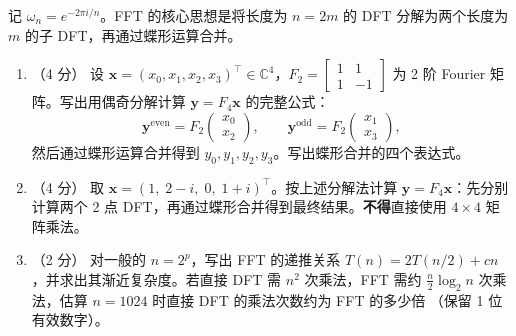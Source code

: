 \documentclass[10pt,a4paper]{exam-zh}
\newcommand{\bvec}[1]{\boldsymbol{#1}}
\newcommand{\C}{\mathbb{C}}
\begin{document}
\begin{problem}[points = 10]

记 $\omega_n = e^{-2\pi i/n}$。FFT 的核心思想是将长度为 $n=2m$ 的 DFT 分解为两个长度为 $m$ 的子 DFT，再通过蝶形运算合并。

\begin{enumerate}
    \item （4 分） 设 $\bvec{x} = (x_0, x_1, x_2, x_3)^\top \in \C^4$，$F_2 = \begin{bmatrix} 1 & 1 \\ 1 & -1 \end{bmatrix}$ 为 2 阶 Fourier 矩阵。写出用偶奇分解计算 $\bvec{y} = F_4 \bvec{x}$ 的完整公式：
    \[
    \bvec{y}^{\text{even}} = F_2\begin{pmatrix} x_0 \\ x_2 \end{pmatrix}, \qquad
    \bvec{y}^{\text{odd}} = F_2\begin{pmatrix} x_1 \\ x_3 \end{pmatrix},
    \]
    然后通过蝶形运算合并得到 $y_0, y_1, y_2, y_3$。写出蝶形合并的四个表达式。

    \item （4 分） 取 $\bvec{x} = (1,\; 2-i,\; 0,\; 1+i)^\top$。按上述分解法计算 $\bvec{y} = F_4\bvec{x}$：先分别计算两个 2 点 DFT，再通过蝶形合并得到最终结果。\textbf{不得}直接使用 $4\times4$ 矩阵乘法。

    \item （2 分） 对一般的 $n = 2^p$，写出 FFT 的递推关系
    $T(n) = 2T(n/2) + cn$，并求出其渐近复杂度。若直接 DFT 需
    $n^2$ 次乘法，FFT 需约 $\frac{n}{2}\log_2 n$ 次乘法，估算
    $n = 1024$ 时直接 DFT 的乘法次数约为 FFT 的多少倍
    （保留 1 位有效数字）。
\end{enumerate}
\end{problem}
\end{document}
